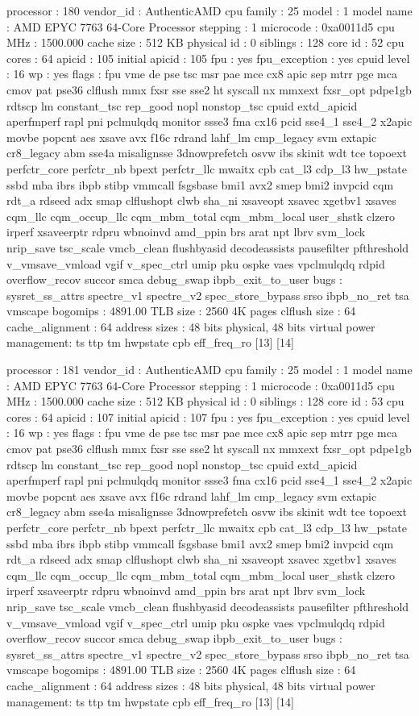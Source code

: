 processor	: 180
vendor_id	: AuthenticAMD
cpu family	: 25
model		: 1
model name	: AMD EPYC 7763 64-Core Processor
stepping	: 1
microcode	: 0xa0011d5
cpu MHz		: 1500.000
cache size	: 512 KB
physical id	: 0
siblings	: 128
core id		: 52
cpu cores	: 64
apicid		: 105
initial apicid	: 105
fpu		: yes
fpu_exception	: yes
cpuid level	: 16
wp		: yes
flags		: fpu vme de pse tsc msr pae mce cx8 apic sep mtrr pge mca cmov pat pse36 clflush mmx fxsr sse sse2 ht syscall nx mmxext fxsr_opt pdpe1gb rdtscp lm constant_tsc rep_good nopl nonstop_tsc cpuid extd_apicid aperfmperf rapl pni pclmulqdq monitor ssse3 fma cx16 pcid sse4_1 sse4_2 x2apic movbe popcnt aes xsave avx f16c rdrand lahf_lm cmp_legacy svm extapic cr8_legacy abm sse4a misalignsse 3dnowprefetch osvw ibs skinit wdt tce topoext perfctr_core perfctr_nb bpext perfctr_llc mwaitx cpb cat_l3 cdp_l3 hw_pstate ssbd mba ibrs ibpb stibp vmmcall fsgsbase bmi1 avx2 smep bmi2 invpcid cqm rdt_a rdseed adx smap clflushopt clwb sha_ni xsaveopt xsavec xgetbv1 xsaves cqm_llc cqm_occup_llc cqm_mbm_total cqm_mbm_local user_shstk clzero irperf xsaveerptr rdpru wbnoinvd amd_ppin brs arat npt lbrv svm_lock nrip_save tsc_scale vmcb_clean flushbyasid decodeassists pausefilter pfthreshold v_vmsave_vmload vgif v_spec_ctrl umip pku ospke vaes vpclmulqdq rdpid overflow_recov succor smca debug_swap ibpb_exit_to_user
bugs		: sysret_ss_attrs spectre_v1 spectre_v2 spec_store_bypass srso ibpb_no_ret tsa vmscape
bogomips	: 4891.00
TLB size	: 2560 4K pages
clflush size	: 64
cache_alignment	: 64
address sizes	: 48 bits physical, 48 bits virtual
power management: ts ttp tm hwpstate cpb eff_freq_ro [13] [14]

processor	: 181
vendor_id	: AuthenticAMD
cpu family	: 25
model		: 1
model name	: AMD EPYC 7763 64-Core Processor
stepping	: 1
microcode	: 0xa0011d5
cpu MHz		: 1500.000
cache size	: 512 KB
physical id	: 0
siblings	: 128
core id		: 53
cpu cores	: 64
apicid		: 107
initial apicid	: 107
fpu		: yes
fpu_exception	: yes
cpuid level	: 16
wp		: yes
flags		: fpu vme de pse tsc msr pae mce cx8 apic sep mtrr pge mca cmov pat pse36 clflush mmx fxsr sse sse2 ht syscall nx mmxext fxsr_opt pdpe1gb rdtscp lm constant_tsc rep_good nopl nonstop_tsc cpuid extd_apicid aperfmperf rapl pni pclmulqdq monitor ssse3 fma cx16 pcid sse4_1 sse4_2 x2apic movbe popcnt aes xsave avx f16c rdrand lahf_lm cmp_legacy svm extapic cr8_legacy abm sse4a misalignsse 3dnowprefetch osvw ibs skinit wdt tce topoext perfctr_core perfctr_nb bpext perfctr_llc mwaitx cpb cat_l3 cdp_l3 hw_pstate ssbd mba ibrs ibpb stibp vmmcall fsgsbase bmi1 avx2 smep bmi2 invpcid cqm rdt_a rdseed adx smap clflushopt clwb sha_ni xsaveopt xsavec xgetbv1 xsaves cqm_llc cqm_occup_llc cqm_mbm_total cqm_mbm_local user_shstk clzero irperf xsaveerptr rdpru wbnoinvd amd_ppin brs arat npt lbrv svm_lock nrip_save tsc_scale vmcb_clean flushbyasid decodeassists pausefilter pfthreshold v_vmsave_vmload vgif v_spec_ctrl umip pku ospke vaes vpclmulqdq rdpid overflow_recov succor smca debug_swap ibpb_exit_to_user
bugs		: sysret_ss_attrs spectre_v1 spectre_v2 spec_store_bypass srso ibpb_no_ret tsa vmscape
bogomips	: 4891.00
TLB size	: 2560 4K pages
clflush size	: 64
cache_alignment	: 64
address sizes	: 48 bits physical, 48 bits virtual
power management: ts ttp tm hwpstate cpb eff_freq_ro [13] [14]

